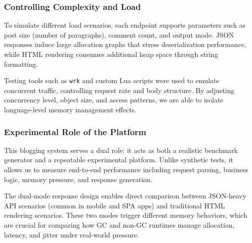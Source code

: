 \subsubsection{Controlling Complexity and Load}

To simulate different load scenarios, each endpoint supports parameters such as post size (number of paragraphs), comment count, and output mode. JSON responses induce large allocation graphs that stress deserialization performance, while HTML rendering consumes additional heap space through string formatting.

Testing tools such as \texttt{wrk} and custom Lua scripts were used to emulate concurrent traffic, controlling request rate and body structure. By adjusting concurrency level, object size, and access patterns, we are able to isolate language-level memory management effects.

\subsubsection{Experimental Role of the Platform}

This blogging system serves a dual role: it acts as both a realistic benchmark generator and a repeatable experimental platform. Unlike synthetic tests, it allows us to measure end-to-end performance including request parsing, business logic, memory pressure, and response generation.

The dual-mode response design enables direct comparison between JSON-heavy API scenarios (common in mobile and SPA apps) and traditional HTML rendering scenarios. These two modes trigger different memory behaviors, which are crucial for comparing how GC and non-GC runtimes manage allocation, latency, and jitter under real-world pressure.
